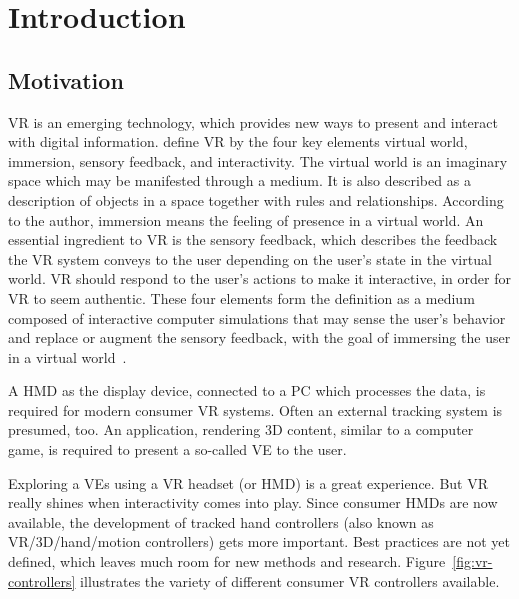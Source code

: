 \chapter{Introduction}\label{chapter:introduction}

\section{Motivation}\label{section:motivation}

\ac{VR} is an emerging technology, which provides new ways to present and interact with digital information. \citeauthor{Sherman.2003} define \ac{VR} by the four key elements virtual world, immersion, sensory feedback, and interactivity. The virtual world is an imaginary space which may be manifested through a medium. It is also described as a description of objects in a space together with rules and relationships. According to the author, immersion means the feeling of presence in a virtual world. An essential ingredient to \ac{VR} is the sensory feedback, which describes the feedback the \ac{VR} system conveys to the user depending on the user's state in the virtual world. \ac{VR} should respond to the user's actions to make it interactive, in order for \ac{VR} to seem authentic.
These four elements form the definition as a medium composed of interactive computer simulations that may sense the user's behavior and replace or augment the sensory feedback, with the goal of immersing the user in a virtual world~\cite[6-12]{Sherman.2003}.

A \ac{HMD} as the display device, connected to a \ac{PC} which processes the data, is required for modern consumer \ac{VR} systems. Often an external tracking system is presumed, too. An application, rendering \ac{3D} content, similar to a computer game, is required to present a so-called \ac{VE} to the user.

Exploring a \acp{VE} using a \ac{VR} headset (or \ac{HMD}) is a great experience. But \ac{VR} really shines when interactivity comes into play. Since consumer \acp{HMD} are now available, the development of tracked hand controllers (also known as \ac{VR}/\ac{3D}/hand/motion controllers) gets more important.
Best practices are not yet defined, which leaves much room for new methods and research. Figure~\ref{fig:vr-controllers} illustrates the variety of different consumer \ac{VR} controllers available.

